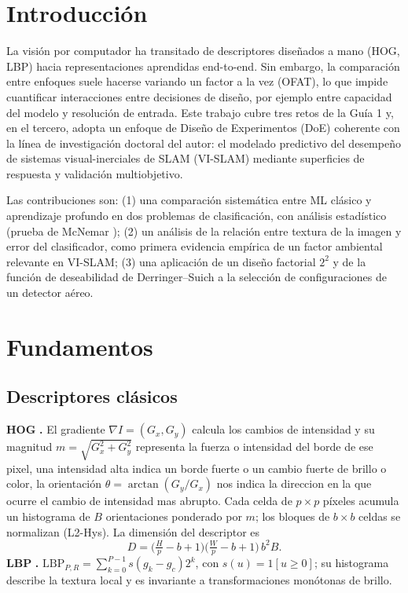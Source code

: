 \documentclass[conference]{IEEEtran}
\begin{document}
\section{Introducción}
La visión por computador ha transitado de descriptores diseñados a mano (HOG, LBP) hacia representaciones aprendidas end-to-end. Sin embargo, la comparación entre enfoques suele hacerse variando un factor a la vez (OFAT), lo que impide cuantificar interacciones entre decisiones de diseño, por ejemplo entre capacidad del modelo y resolución de entrada. Este trabajo cubre tres retos de la Guía 1 y, en el tercero, adopta un enfoque de Diseño de Experimentos (DoE) \cite{montgomery2019,myers2016} coherente con la línea de investigación doctoral del autor: el modelado predictivo del desempeño de sistemas visual-inerciales de SLAM (VI-SLAM) mediante superficies de respuesta y validación multiobjetivo.

Las contribuciones son: (1) una comparación sistemática entre ML clásico y aprendizaje profundo en dos problemas de clasificación, con análisis estadístico (prueba de McNemar \cite{mcnemar1947}); (2) un análisis de la relación entre textura de la imagen y error del clasificador, como primera evidencia empírica de un factor ambiental relevante en VI-SLAM; (3) una aplicación de un diseño factorial $2^2$ y de la función de deseabilidad de Derringer--Suich \cite{derringer1980} a la selección de configuraciones de un detector aéreo.

\section{Fundamentos}
\subsection{Descriptores clásicos}
\textbf{HOG} \cite{dalal2005}\textbf{.} El gradiente $\nabla I=(G_x,G_y)$ calcula los cambios de intensidad y su magnitud $m=\sqrt{G_x^2+G_y^2}$ representa la fuerza o intensidad del borde de ese pixel, una intensidad alta indica un borde fuerte o un cambio fuerte de brillo o color, la orientación $\theta=\arctan(G_y/G_x)$ nos indica la direccion en la que ocurre el cambio de intensidad mas abrupto. Cada celda de $p\times p$ píxeles acumula un histograma de $B$ orientaciones ponderado por $m$; los bloques de $b\times b$ celdas se normalizan (L2-Hys). La dimensión del descriptor es
\begin{equation}
D=\Big(\tfrac{H}{p}-b+1\Big)\Big(\tfrac{W}{p}-b+1\Big)\,b^{2}B .
\end{equation}
\textbf{LBP} \cite{ojala2002}\textbf{.} $\mathrm{LBP}_{P,R}=\sum_{k=0}^{P-1}s(g_k-g_c)2^k$, con $s(u)=1[u\ge0]$; su histograma describe la textura local y es invariante a transformaciones monótonas de brillo.
\end{document}
